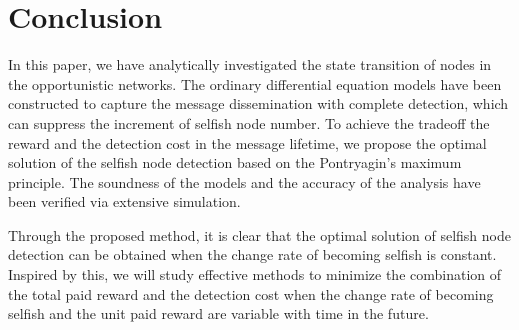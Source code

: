 \section{Conclusion}
\label{sec:conclude}
In this paper, we have analytically investigated
the state transition of nodes in the opportunistic networks.
The ordinary differential equation models have been constructed to
capture the message dissemination with complete detection,
which can suppress the increment of selfish node number.
To achieve the tradeoff the reward and the detection cost
in the message lifetime,
we propose the optimal solution of the selfish node detection
based on the Pontryagin's maximum principle.
The soundness of the models and the accuracy of the analysis
have been verified via extensive simulation.

Through the proposed method,
it is clear that the optimal solution of selfish node detection
can be obtained
when the change rate of becoming selfish is constant.
Inspired by this,
we will study effective methods 
to minimize the combination of 
the total paid reward and the detection cost
when the change rate of becoming selfish 
and the unit paid reward
are variable with time in the future.
